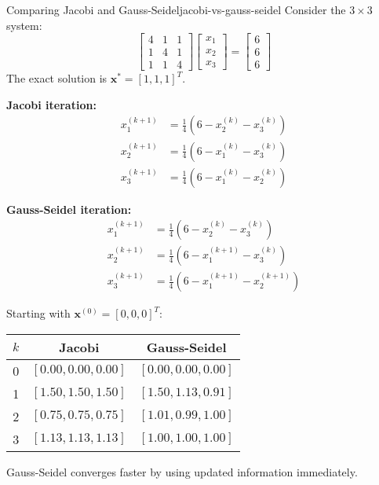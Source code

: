 \begin{example}{Comparing Jacobi and Gauss-Seidel}{jacobi-vs-gauss-seidel}
    Consider the $3 \times 3$ system:
    \begin{equation*}
        \begin{bmatrix}
            4 & 1 & 1 \\
            1 & 4 & 1 \\
            1 & 1 & 4
        \end{bmatrix}
        \begin{bmatrix}
            x_1 \\ x_2 \\ x_3
        \end{bmatrix}
        =
        \begin{bmatrix}
            6 \\ 6 \\ 6
        \end{bmatrix}
    \end{equation*}
    The exact solution is $\mathbf{x}^* = [1, 1, 1]^T$.

    \textbf{Jacobi iteration:}
    \begin{align*}
        x_1^{(k+1)} &= \frac{1}{4}(6 - x_2^{(k)} - x_3^{(k)}) \\
        x_2^{(k+1)} &= \frac{1}{4}(6 - x_1^{(k)} - x_3^{(k)}) \\
        x_3^{(k+1)} &= \frac{1}{4}(6 - x_1^{(k)} - x_2^{(k)})
    \end{align*}

    \textbf{Gauss-Seidel iteration:}
    \begin{align*}
        x_1^{(k+1)} &= \frac{1}{4}(6 - x_2^{(k)} - x_3^{(k)}) \\
        x_2^{(k+1)} &= \frac{1}{4}(6 - x_1^{(k+1)} - x_3^{(k)}) \\
        x_3^{(k+1)} &= \frac{1}{4}(6 - x_1^{(k+1)} - x_2^{(k+1)})
    \end{align*}

    Starting with $\mathbf{x}^{(0)} = [0, 0, 0]^T$:

    \begin{center}
    \begin{tabular}{c|c|c}
        $k$ & Jacobi & Gauss-Seidel \\
        \hline
        0 & $[0.00, 0.00, 0.00]$ & $[0.00, 0.00, 0.00]$ \\
        1 & $[1.50, 1.50, 1.50]$ & $[1.50, 1.13, 0.91]$ \\
        2 & $[0.75, 0.75, 0.75]$ & $[1.01, 0.99, 1.00]$ \\
        3 & $[1.13, 1.13, 1.13]$ & $[1.00, 1.00, 1.00]$ \\
    \end{tabular}
    \end{center}

    Gauss-Seidel converges faster by using updated information immediately.
\end{example}


